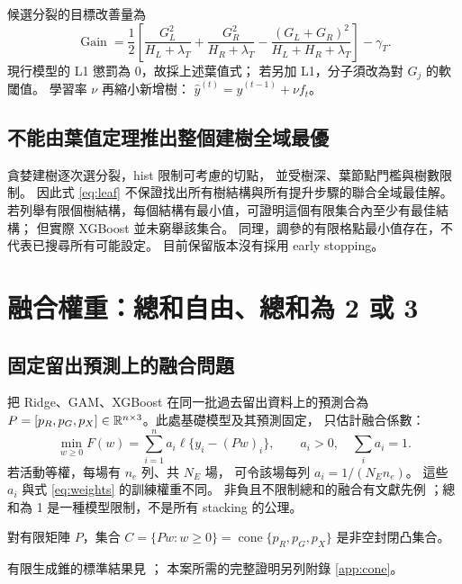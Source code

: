 候選分裂的目標改善量為
\begin{equation}
\operatorname{Gain}
=\frac12\left[
\frac{G_L^2}{H_L+\lambda_T}
+\frac{G_R^2}{H_R+\lambda_T}
-\frac{(G_L+G_R)^2}{H_L+H_R+\lambda_T}\right]-\gamma_T .
\end{equation}
現行模型的 L1 懲罰為 0，故採上述葉值式；
若另加 L1，分子須改為對 $G_j$ 的軟閾值。
學習率 $\nu$ 再縮小新增樹：
$\hat y^{(t)}=\hat y^{(t-1)}+\nu f_t$。

\subsection{不能由葉值定理推出整個建樹全域最優}
貪婪建樹逐次選分裂，hist 限制可考慮的切點，
並受樹深、葉節點門檻與樹數限制。
因此式 \eqref{eq:leaf} 不保證找出所有樹結構與所有提升步驟的聯合全域最佳解。
若列舉有限個樹結構，每個結構有最小值，可證明這個有限集合內至少有最佳結構；
但實際 XGBoost 並未窮舉該集合。
同理，調參的有限格點最小值存在，不代表已搜尋所有可能設定。
目前保留版本沒有採用 early stopping。

\section{融合權重：總和自由、總和為 2 或 3}

\subsection{固定留出預測上的融合問題}
把 Ridge、GAM、XGBoost 在同一批過去留出資料上的預測合為
$P=[p_R,p_G,p_X]\in\mathbb R^{n\times3}$。此處基礎模型及其預測固定，
只估計融合係數：
\begin{equation}
\min_{w\ge0}F(w)
=\sum_{i=1}^n a_i\ell\{y_i-(Pw)_i\},
\qquad a_i>0,\quad\sum_i a_i=1 .
\label{eq:fusion}
\end{equation}
若活動等權，每場有 $n_e$ 列、共 $N_E$ 場，
可令該場每列 $a_i=1/(N_En_e)$。
這些 $a_i$ 與式 \eqref{eq:weights} 的訓練權重不同。
非負且不限制總和的融合有文獻先例
\cite{breiman,pystacked}；總和為 1 是一種模型限制，不是所有 stacking 的公理。

\begin{lemma}[有限生成錐封閉]\label{lem:cone}
對有限矩陣 $P$，集合
$C=\{Pw:w\ge0\}=\operatorname{cone}\{p_R,p_G,p_X\}$
是非空封閉凸集合。
\end{lemma}
有限生成錐的標準結果見 \cite{bertsekas}；
本案所需的完整證明另列附錄 \ref{app:cone}。

